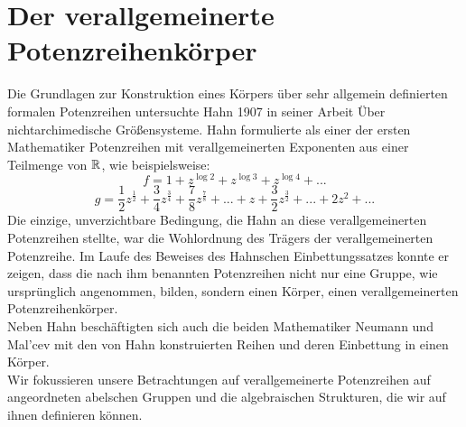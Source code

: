 %
% 
%
%
%
%
%
\section{Der verallgemeinerte Potenzreihenkörper}
%
Die Grundlagen zur Konstruktion eines Körpers über sehr allgemein definierten formalen Potenzreihen untersuchte Hahn 1907 in seiner Arbeit \glqq Über nichtarchimedische Größensysteme\grqq. 
Hahn formulierte als einer der ersten Mathematiker Potenzreihen mit verallgemeinerten Exponenten aus einer Teilmenge von $\mathbb{R}$, wie beispielsweise:\\
\[ f = 1 + z^{\log 2} + z^{\log 3} + z^{\log 4} + ... \]
\[g = \frac{1}{2}z^{\frac{1}{2}} + \frac{3}{4}z^\frac{3}{4} + \frac{7}{8}z^\frac{7}{8} + ... + z + \frac{3}{2}z^\frac{3}{2} + ... + 2z^2 + ...\] 
Die einzige, unverzichtbare Bedingung, die Hahn an diese verallgemeinerten Potenzreihen stellte, war die Wohlordnung des Trägers der verallgemeinerten Potenzreihe.
Im Laufe des Beweises des Hahnschen Einbettungssatzes konnte er zeigen, dass die nach ihm benannten Potenzreihen nicht nur eine Gruppe, wie ursprünglich angenommen, bilden, sondern einen Körper, einen verallgemeinerten Potenzreihenkörper. \\ 
Neben Hahn beschäftigten sich auch die beiden Mathematiker Neumann und Mal'cev mit den von Hahn konstruierten Reihen und deren Einbettung in einen Körper. \\
Wir fokussieren unsere Betrachtungen auf verallgemeinerte Potenzreihen auf angeordneten abelschen Gruppen und die algebraischen Strukturen, die wir auf ihnen definieren können. 

